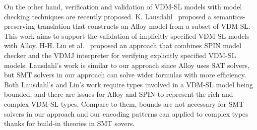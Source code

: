 On the other hand, verification and validation of VDM-SL models with model checking techniques are recently proposed. K. Lausdahl~\cite{kenneth:ifm2013} proposed a semantics-preserving translation that constructs an Alloy model from a subset of VDM-SL. This work aims to support the validation of implicitly specified VDM-SL models with Alloy. H-H. Lin et al.~\cite{DBLP:conf/ftscs/LinOKA15} proposed an approach that combines SPIN model checker and the VDMJ interpreter for verifying explicitly specified VDM-SL models. Lausdahl's work is similar to our approach since Alloy uses SAT solvers, but SMT solvers in our approach can solve wider formulas with more efficiency. Both Lausdahl's and Lin's work require types involved in a VDM-SL model being bounded, and there are issues for Alloy and SPIN to represent the rich and complex VDM-SL types. Compare to them, bounds are not necessary for SMT solvers in our approach and our encoding patterns can applied to complex types thanks for build-in theories in SMT sovers.


